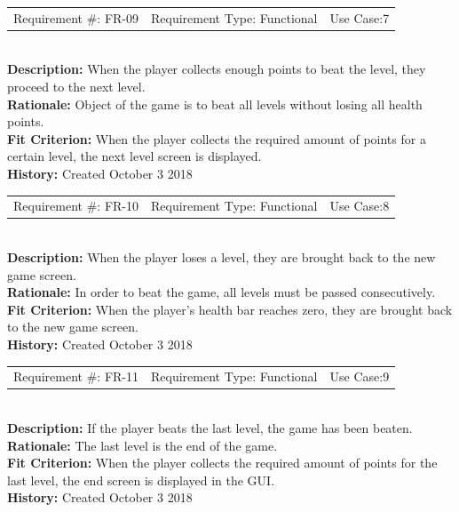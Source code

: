 \documentclass[12pt, titlepage]{article}
\begin{document}
\begin{reqbox}
	\begin{tabular}{c|c|c}
		Requirement \#: FR-09 & Requirement Type: Functional & Use Case:7 \\
	\end{tabular} \\
	\textbf{Description:} When the player collects enough points to beat the level, they proceed to the next level. \\
	\textbf{Rationale:} Object of the game is to beat all levels without losing all health points. \\
	\textbf{Fit Criterion:} When the player collects the required amount of points for a certain level, the next level screen is displayed. \\
	\textbf{History:} Created October 3 2018
\end{reqbox}

\begin{reqbox}
	\begin{tabular}{c|c|c}
		Requirement \#: FR-10 & Requirement Type: Functional & Use Case:8 \\
	\end{tabular} \\
	\textbf{Description:} When the player loses a level, they are brought back to the new game screen. \\
	\textbf{Rationale:} In order to beat the game, all levels must be passed consecutively. \\
	\textbf{Fit Criterion:} When the player's health bar reaches zero, they are brought back to the new game screen. \\
	\textbf{History:} Created October 3 2018
\end{reqbox}

\begin{reqbox}
	\begin{tabular}{c|c|c}
		Requirement \#: FR-11 & Requirement Type: Functional & Use Case:9 \\
	\end{tabular} \\
	\textbf{Description:} If the player beats the last level, the game has been beaten. \\
	\textbf{Rationale:} The last level is the end of the game. \\
	\textbf{Fit Criterion:} When the player collects the required amount of points for the last level, the end screen is displayed in the GUI. \\
	\textbf{History:} Created October 3 2018
\end{reqbox}
\end{document}
